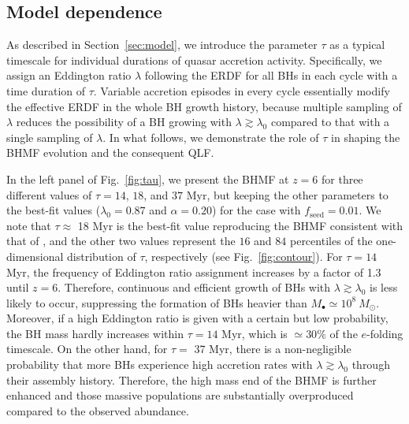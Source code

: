 \documentclass[twocolumn, twocolappendix]{aastex63}
\newcommand{\Msun}{M_\odot}
\newcommand{\tlife}{\tau}
\newcommand{\fseed}{f_\mathrm{seed}}
\begin{document}
\begin{CJK*}{UTF8}{gbsn}
\vspace{2mm}
\section{Model dependence}\label{sec:modep}
As described in Section~\ref{sec:model}, we introduce the parameter $\tau$ as a typical timescale
for individual durations of quasar accretion activity.
Specifically, we assign an Eddington ratio $\lambda$ following the ERDF for all BHs in each cycle
with a time duration of $\tau$.
Variable accretion episodes in every cycle essentially modify the effective ERDF in the whole BH growth history,
because multiple sampling of $\lambda$ reduces the possibility of a BH growing with $\lambda \gtrsim \lambda_0$
compared to that with a single sampling of $\lambda$.
In what follows, we demonstrate the role of $\tlife$ in shaping the BHMF evolution and the consequent QLF.

In the left panel of Fig.~\ref{fig:tau}, we present the BHMF at $z=6$ for three different values of $\tlife=14$, $18$, and $37$ Myr,
but keeping the other parameters to the best-fit values ($\lambda_0=0.87$ and $\alpha=0.20$) for the case with $\fseed=0.01$.
We note that $\tlife \approx$ 18 Myr is the best-fit value reproducing the BHMF consistent with that of ,
and the other two values represent the $16$ and $84$ percentiles of the one-dimensional distribution of $\tau$, respectively (see Fig.~\ref{fig:contour}).
For $\tlife=14$ Myr, the frequency of Eddington ratio assignment increases by a factor of 1.3 until $z=6$.
Therefore, continuous and efficient growth of BHs with $\lambda \gtrsim \lambda_0$ is less likely to occur,
suppressing the formation of BHs heavier than $M_\bullet \simeq 10^8~\Msun$.
Moreover, if a high Eddington ratio is given with a certain but low probability, the BH mass hardly increases
within $\tlife=14$ Myr, which is $\simeq 30\%$ of the $e$-folding timescale.
On the other hand, for $\tlife=$ 37 Myr, there is a non-negligible probability that
more BHs experience high accretion rates with $\lambda\gtrsim \lambda_0$ through their assembly history.
Therefore, the high mass end of the BHMF is further enhanced and those massive populations are substantially
overproduced compared to the observed abundance.


\end{CJK*}
\end{document}
